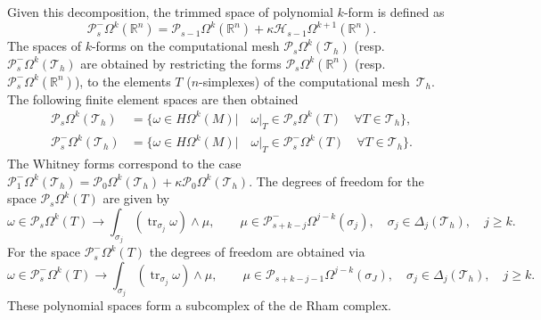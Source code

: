 \documentclass{elsarticle}
\newcommand{\bbR}{\mathbb{R}}
\DeclareMathOperator{\tr}{tr}
\begin{document}
Given this decomposition, the trimmed space of polynomial $k$-form is defined as
\begin{equation}
    \mathcal{P}^-_s\Omega^k(\bbR^n)  = \mathcal{P}_{s - 1}\Omega^k(\bbR^n) + \kappa \mathcal{H}_{s - 1}\Omega^{k+1}(\bbR^n).
\end{equation}
The spaces of $k$-forms on the computational mesh $\mathcal{P}_s\Omega^k(\mathcal{T}_h)$ (resp. $\mathcal{P}^-_s\Omega^k(\mathcal{T}_h)$ are obtained by restricting the forms $\mathcal{P}_s\Omega^k(\bbR^n)$ (resp. $\mathcal{P}_s^-\Omega^k(\bbR^n)$), to the elements $T$ ($n$-simplexes) of the computational mesh~$\mathcal{T}_h$. The following finite element spaces are then obtained
\begin{equation}
\begin{aligned}
    \mathcal{P}_s\Omega^k(\mathcal{T}_h) &= \{\omega \in H\Omega^k(M) |\quad \omega|_T \in \mathcal{P}_s\Omega^k(T) \quad \forall T \in \mathcal{T}_h\}, \\
\mathcal{P}_s^-\Omega^k(\mathcal{T}_h) &= \{\omega \in H\Omega^k(M) |\quad \omega|_T \in \mathcal{P}_s^-\Omega^k(T) \quad \forall T \in \mathcal{T}_h\}.
\end{aligned}
\end{equation}
The Whitney forms correspond to the case $\mathcal{P}_1^-\Omega^k(\mathcal{T}_h) = \mathcal{P}_0\Omega^k(\mathcal{T}_h) + \kappa \mathcal{P}_0\Omega^k(\mathcal{T}_h)$. The degrees of freedom for the space $\mathcal{P}_s\Omega^k(T)$ are given by
\begin{equation}\label{eq:dof_P}
    \omega \in \mathcal{P}_s\Omega^k(T) \rightarrow \int_{\sigma_j} (\tr_{\sigma_j} \omega) \wedge \mu, \qquad \mu \in \mathcal{P}^-_{s+k-j}\Omega^{j-k}(\sigma_j), \quad \sigma_j \in \Delta_j(\mathcal{T}_h), \quad j \ge k.
\end{equation}
For the space $\mathcal{P}_s^-\Omega^k(T)$ the degrees of freedom are obtained via
\begin{equation}\label{eq:dof_P-}
    \omega \in \mathcal{P}_s^-\Omega^k(T) \rightarrow \int_{\sigma_j} (\tr_{\sigma_j} \omega) \wedge \mu, \qquad \mu \in \mathcal{P}_{s+k-j-1}\Omega^{j-k}(\sigma_J), \quad \sigma_j \in \Delta_j(\mathcal{T}_h), \quad j \ge k.
\end{equation}
These polynomial spaces form a subcomplex of the de Rham complex.
\end{document}
